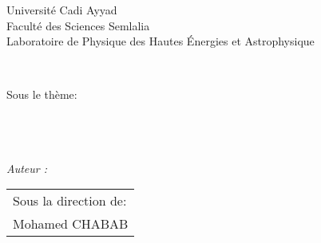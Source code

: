 \begin{titlepage}
	
	\begin{figure}[h!]
		\begin{minipage}[b]{0.25\linewidth}
			\begin{center}
			\end{center}
			
		\end{minipage}\hfill
		\begin{minipage}[b]{0.45\linewidth}   
			\begin{center}
			\end{center}
			
		\end{minipage}
		\begin{minipage}[b]{0.27\linewidth}
			\begin{center}
			\end{center}
			
		\end{minipage}\hfill
		
	\end{figure}
	\begin{center}
		\huge{ Université Cadi Ayyad} \\
		\large Faculté des Sciences Semlalia\\
		Laboratoire de Physique des Hautes Énergies et Astrophysique
	\end{center}
	
	\HRule 
	\begin{center}
		
		{\Large \reportsubject}\\[0.5cm]
		\vspace{0.4cm}
		
		
		\Large Sous le thème:\\
		\HRule \\[0.8cm]
		{\Huge \bfseries \reporttitle}\\[0.4cm]
		
		\HRule \\[0.8cm]
		
		\begin{Large}
			
			\begin{minipage}[b]{0.45\linewidth}
				\begin{flushleft}
					\emph{Auteur :}\\
					\reportauthor
				\end{flushleft}       
			\end{minipage}
			\begin{minipage}[b]{0.45\linewidth}   
				\begin{flushright}
					\begin{tabular}{l}
						Sous la direction de: \\
						Mohamed \textsc{CHABAB} 
		

\end{tabular}
\end{flushright}
\end{minipage}
\end{Large}
\end{center}
\end{titlepage}
